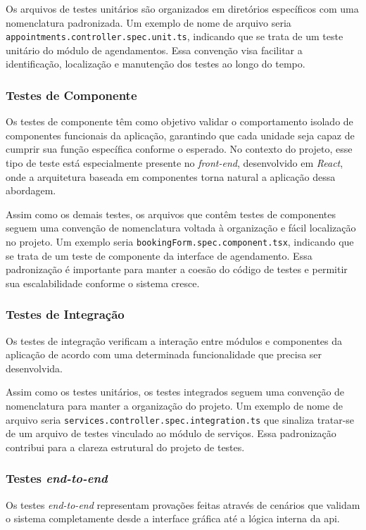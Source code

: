 Os arquivos de testes unitários são organizados em diretórios específicos com uma nomenclatura padronizada. Um exemplo de nome de arquivo seria \texttt{appointments.\allowbreak controller.\allowbreak spec.\allowbreak unit.ts}, indicando que se trata de um teste unitário do módulo de agendamentos. Essa convenção visa facilitar a identificação, localização e manutenção dos testes ao longo do tempo.

\subsubsection{Testes de Componente}
Os testes de componente têm como objetivo validar o comportamento isolado de componentes funcionais da aplicação, garantindo que cada unidade seja capaz de cumprir sua função específica conforme o esperado. No contexto do projeto, esse tipo de teste está especialmente presente no \textit{front-end}, desenvolvido em \textit{React}, onde a arquitetura baseada em componentes torna natural a aplicação dessa abordagem.

Assim como os demais testes, os arquivos que contêm testes de componentes seguem uma convenção de nomenclatura voltada à organização e fácil localização no projeto. Um exemplo seria \texttt{bookingForm.\allowbreak spec.\allowbreak component.\allowbreak tsx}, indicando que se trata de um teste de componente da interface de agendamento. Essa padronização é importante para manter a coesão do código de testes e permitir sua escalabilidade conforme o sistema cresce.

\subsubsection{Testes de Integração}
Os testes de integração verificam a interação entre módulos e componentes da aplicação de acordo com uma determinada funcionalidade que precisa ser desenvolvida.

Assim como os testes unitários, os testes integrados seguem uma convenção de nomenclatura para manter a organização do projeto. Um exemplo de nome de arquivo seria \texttt{services.\allowbreak controller.\allowbreak spec.\allowbreak integration.ts} que sinaliza tratar-se de um arquivo de testes vinculado ao módulo de serviços. Essa padronização contribui para a clareza estrutural do projeto de testes.


\subsubsection{Testes \textit{end-to-end}}
Os testes \textit{end-to-end} representam provações feitas através de cenários que validam o sistema completamente desde a interface gráfica até a lógica interna da \gls{api}.

